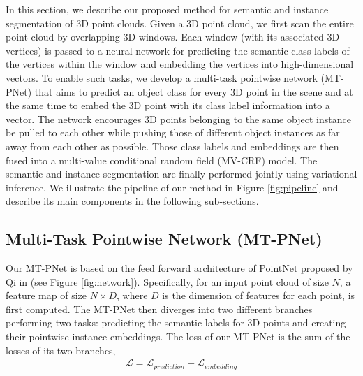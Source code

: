 \documentclass[10pt,twocolumn,letterpaper]{article}
\begin{document}
In this section, we describe our proposed method for semantic and instance
segmentation of 3D point clouds. Given a 3D point cloud, we first scan the
entire point cloud by overlapping 3D windows. Each window (with its associated
3D vertices) is passed to a neural network for predicting the semantic class
labels of the vertices within the window and embedding the vertices into
high-dimensional vectors. To enable such tasks, we develop a multi-task
pointwise network (MT-PNet) that aims to predict an object class for every 3D
point in the scene and at the same time to embed the 3D point with its class
label information into a vector. The network encourages 3D points belonging to
the same object instance be pulled to each other while pushing those of
different object instances as far away from each other as possible. Those class
labels and embeddings are then fused into a multi-value conditional random field
(MV-CRF) model. The semantic and instance segmentation are finally performed
jointly using variational inference. We illustrate the pipeline of our method in
Figure \ref{fig:pipeline} and describe its main components in the following
sub-sections.

\subsection{Multi-Task Pointwise Network (MT-PNet)}
Our MT-PNet is based on the feed forward architecture of PointNet proposed by Qi
\etal in \cite{qi-pointnet-cvpr17} (see Figure \ref{fig:network}). Specifically,
for an input point cloud of size $N$, a feature map of size $N \times D$, where
$D$ is the dimension of features for each point, is first computed. The MT-PNet
then diverges into two different branches performing two tasks: predicting the
semantic labels for 3D points and creating their pointwise instance
embeddings. The loss of our MT-PNet is the sum of the losses of its two
branches,
\begin{align}
  \label{eq:loss}
  \mathcal{L} = \mathcal{L}_{prediction} + \mathcal{L}_{embedding}
\end{align}
\end{document}

